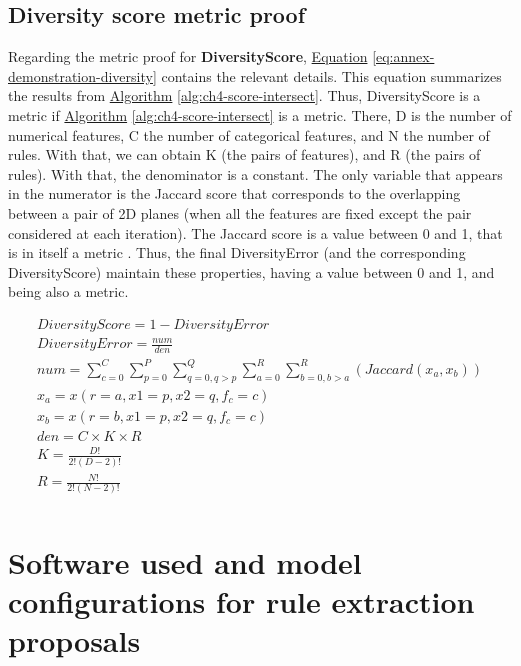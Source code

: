 \subsection{Diversity score metric proof}\label{sec:annex-demonstration-metric-diversity}
Regarding the metric proof for \textbf{DiversityScore}, \hyperref[eq:annex-demonstration-diversity]{Equation} \ref{eq:annex-demonstration-diversity} contains the relevant details. This equation summarizes the results from \hyperref[alg:ch4-score-intersect]{Algorithm} \ref{alg:ch4-score-intersect}. Thus, DiversityScore is a metric if \hyperref[alg:ch4-score-intersect]{Algorithm} \ref{alg:ch4-score-intersect} is a metric. There, D is the number of numerical features, C the number of categorical features, and N the number of rules. With that, we can obtain K (the pairs of features), and R (the pairs of rules). With that, the denominator is a constant. The only variable that appears in the numerator is the Jaccard score that corresponds to the overlapping between a pair of 2D planes (when all the features are fixed except the pair considered at each iteration). The Jaccard score is a value between 0 and 1, that is in itself a metric \parencite{jaccard1912distribution}. Thus, the final DiversityError (and the corresponding DiversityScore) maintain these properties, having a value between 0 and 1, and being also a metric.

\begin{equation}\label{eq:annex-demonstration-diversity}
\begin{split}
  DiversityScore = 1 - DiversityError\\
  DiversityError = \frac{num}{den} \\
  num = \sum_{c=0}^{C}\sum_{p=0}^{P}\sum_{q=0, q>p}^{Q}\sum_{a=0}^{R}\sum_{b=0, b>a}^{R}(Jaccard(x_a, x_b))                 \\
  x_a = x(r=a, x1=p, x2=q, f_c=c) \\
  x_b = x(r=b, x1=p, x2=q, f_c=c) \\
  den = C \times K \times R \\
  K = \frac{D!}{2! (D-2)!} \\
  R = \frac{N!}{2! (N-2)!} \\
\end{split}
\end{equation} 

\newpage

\section{Software used and model configurations for rule extraction proposals}\label{sec:annex-rule-extraction-config}

